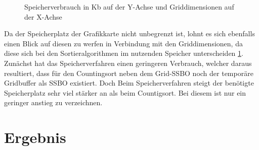 \documentclass[intern,palatino]{cgBA}
\begin{document}
\begin{figure}[H]
	\centering
	\caption{Speicherverbrauch in Kb auf der Y-Achse und Griddimensionen auf der X-Achse }
	\label{dia:speicher}
\end{figure}

Da der Speicherplatz der Grafikkarte nicht unbegrenzt ist, lohnt es sich ebenfalls einen Blick auf diesen zu werfen in Verbindung mit den Griddimensionen, da diese sich bei den Sortieralgorithmen im nutzenden Speicher unterscheiden \ref{dia:speicher}.
\newline
Zunächst hat das Speicherverfahren einen geringeren Verbrauch, welcher daraus resultiert, dass für den Countingsort neben dem Grid-SSBO noch der temporäre Gridbuffer als SSBO existiert. Doch Beim Speicherverfahren steigt der benötigte Speicherplatz sehr viel stärker an als beim Countigsort. Bei diesem ist nur ein geringer anstieg zu verzeichnen.


\section{Ergebnis}\label{ergebnis}
\end{document}
